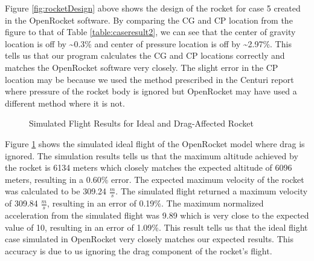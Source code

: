 \documentclass{report}
\begin{document}
\noindent Figure \ref{fig:rocketDesign} above shows the design of the rocket for case 5 created in the OpenRocket software.
By comparing the CG and CP location from the figure to that of Table \ref{table:caseresult2}, we can see that the center of gravity location is off by \textasciitilde0.3\% and center of pressure location is off by \textasciitilde2.97\%.
This tells us that our program calculates the CG and CP locations correctly and matches the OpenRocket software very closely.
The slight error in the CP location may be because we used the method prescribed in the Centuri report where pressure of the rocket body is ignored but OpenRocket may have used a different method where it is not.\\

\begin{figure}[h!]
    \centering
    \caption{Simulated Flight Results for Ideal and Drag-Affected Rocket}
    \label{fig:ideal}
\end{figure}

\noindent Figure \ref{fig:ideal} shows the simulated ideal flight of the OpenRocket model where drag is ignored. 
The simulation results tells us that the maximum altitude achieved by the rocket is 6134 meters which closely matches the expected altitude of 6096 meters, resulting in a 0.60\% error.
The expected maximum velocity of the rocket was calculated to be 309.24 $\frac{m}{s}$.
The simulated flight returned a maximum velocity of 309.84 $\frac{m}{s}$, resulting in an error of 0.19\%.
The maximum normalized acceleration from the simulated flight was 9.89 which is very close to the expected value of 10, resulting in an error of 1.09\%.
This result tells us that the ideal flight case simulated in OpenRocket very closely matches our expected results.
This accuracy is due to us ignoring the drag component of the rocket's flight.\\
\end{document}
